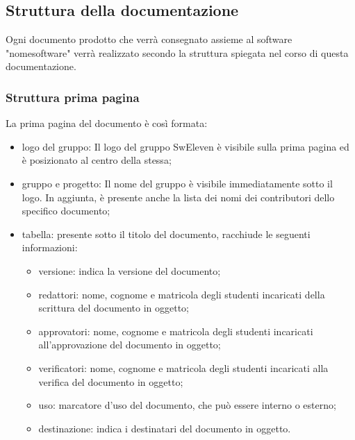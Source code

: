 \subsection{Struttura della documentazione}
Ogni documento prodotto che verrà consegnato assieme al software "nomesoftware" verrà realizzato secondo la struttura spiegata nel corso di questa documentazione.

\subsubsection{Struttura prima pagina}
La prima pagina del documento è così formata:
\begin{itemize}
	\item logo del gruppo: Il logo del gruppo SwEleven è visibile sulla prima pagina ed è posizionato al centro della stessa;
	\item gruppo e progetto: Il nome del gruppo è visibile immediatamente sotto il logo. In aggiunta, è presente anche la lista dei nomi dei contributori dello specifico documento;
	\item tabella: presente sotto il titolo del documento, racchiude le seguenti informazioni:
	\begin{itemize}
		\item versione: indica la versione del documento;
		\item redattori: nome, cognome e matricola degli studenti incaricati della scrittura del documento in oggetto;
		\item approvatori: nome, cognome e matricola degli studenti incaricati all’approvazione del documento in oggetto;
		\item verificatori: nome, cognome e matricola degli studenti incaricati alla verifica del documento in oggetto;
		\item uso: marcatore d’uso del documento, che può essere interno o esterno;
		\item destinazione: indica i destinatari del documento in oggetto.
		\end{itemize}
	\end{itemize}
	
